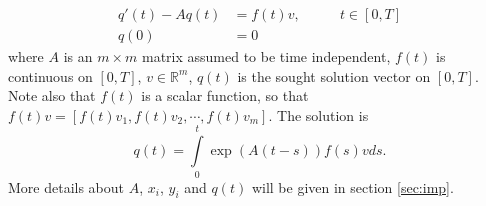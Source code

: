 \begin{equation} \label{eqn:numheat}
\begin{aligned}
q'(t) -Aq(t) &= f(t) v, \qquad & t \in [0,T] \\
q(0) &= 0               
\end{aligned}
\end{equation}
where $A$ is an $m \times m$ matrix assumed to be time independent, $f(t)$ is continuous on $[0,T]$, $v \in \mathbb{R}^m$, $q(t)$ is the sought solution vector on $[0,T]$. Note also that $f(t)$ is a scalar function, so that $f(t) v = [f(t)v_1,f(t)v_2, \cdots,f(t) v_m] $.
The solution is 
\begin{equation*}
q(t) = \int \limits_0^t \exp(A(t-s))f(s)v ds.
\end{equation*}
More details about $A$, $x_i$, $y_i$ and $q(t)$ will be given in section \ref{sec:imp}.
